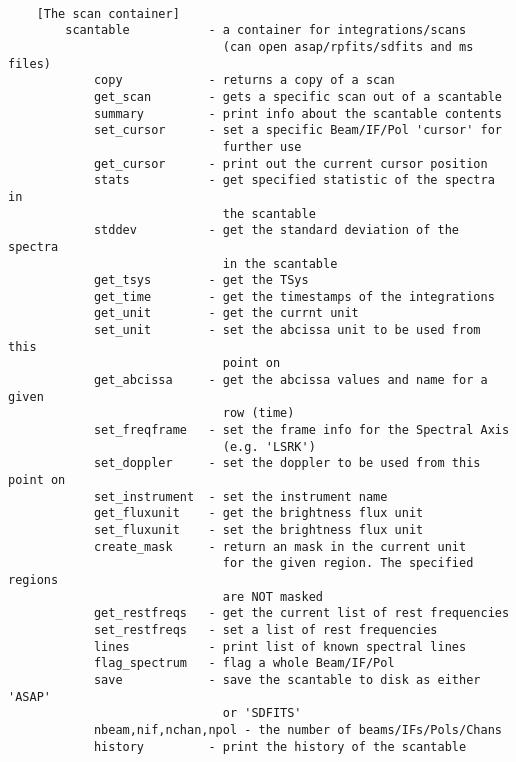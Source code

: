 \documentclass[11pt]{article}
\begin{document}
\begin{verbatim}

    [The scan container]
        scantable           - a container for integrations/scans
                              (can open asap/rpfits/sdfits and ms files)
            copy            - returns a copy of a scan
            get_scan        - gets a specific scan out of a scantable
            summary         - print info about the scantable contents
            set_cursor      - set a specific Beam/IF/Pol 'cursor' for
                              further use
            get_cursor      - print out the current cursor position
            stats           - get specified statistic of the spectra in
                              the scantable
            stddev          - get the standard deviation of the spectra
                              in the scantable
            get_tsys        - get the TSys
            get_time        - get the timestamps of the integrations
            get_unit        - get the currnt unit
            set_unit        - set the abcissa unit to be used from this
                              point on
            get_abcissa     - get the abcissa values and name for a given
                              row (time)
            set_freqframe   - set the frame info for the Spectral Axis
                              (e.g. 'LSRK')
            set_doppler     - set the doppler to be used from this point on
            set_instrument  - set the instrument name
            get_fluxunit    - get the brightness flux unit
            set_fluxunit    - set the brightness flux unit
            create_mask     - return an mask in the current unit
                              for the given region. The specified regions
                              are NOT masked
            get_restfreqs   - get the current list of rest frequencies
            set_restfreqs   - set a list of rest frequencies
            lines           - print list of known spectral lines
            flag_spectrum   - flag a whole Beam/IF/Pol
            save            - save the scantable to disk as either 'ASAP'
                              or 'SDFITS'
            nbeam,nif,nchan,npol - the number of beams/IFs/Pols/Chans
            history         - print the history of the scantable


\end{verbatim}
\end{document}
